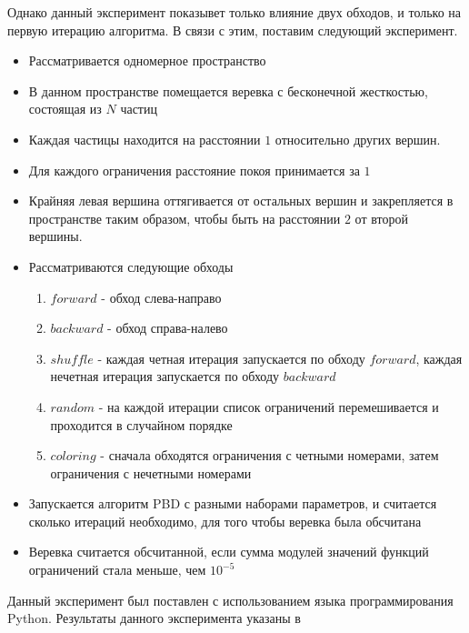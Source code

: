 	Однако данный эксперимент показывет только влияние двух обходов, и только на первую итерацию алгоритма. В связи с этим, поставим следующий эксперимент.
	
	\begin{itemize}
		\item Рассматривается одномерное пространство
		\item В данном пространстве помещается веревка с бесконечной жесткостью, состоящая из $N$ частиц
		\item Каждая частицы находится на расстоянии $1$ относительно других вершин.
		\item Для каждого ограничения расстояние покоя принимается за $1$
		\item Крайняя левая вершина оттягивается от остальных вершин и закрепляется в пространстве таким образом, чтобы быть на расстоянии $2$ от второй вершины.
		\item Рассматриваются следующие обходы
			\begin{enumerate}[1.]
				\item $forward$ - обход слева-направо
				\item $backward$ - обход справа-налево
				\item $shuffle$ - каждая четная итерация запускается по обходу $forward$, каждая нечетная итерация запускается по обходу $backward$
				\item $random$ - на каждой итерации список ограничений перемешивается и проходится в случайном порядке
				\item $coloring$ - сначала обходятся ограничения с четными номерами, затем ограничения с нечетными номерами
			\end{enumerate}
		\item Запускается алгоритм PBD с разными наборами параметров, и считается сколько итераций необходимо, для того чтобы веревка была обсчитана
		\item Веревка считается обсчитанной, если сумма модулей значений функций ограничений стала меньше, чем $10^{-5}$
	\end{itemize}
	
	Данный эксперимент был поставлен с использованием языка программирования Python. Результаты данного эксперимента указаны в 
	
